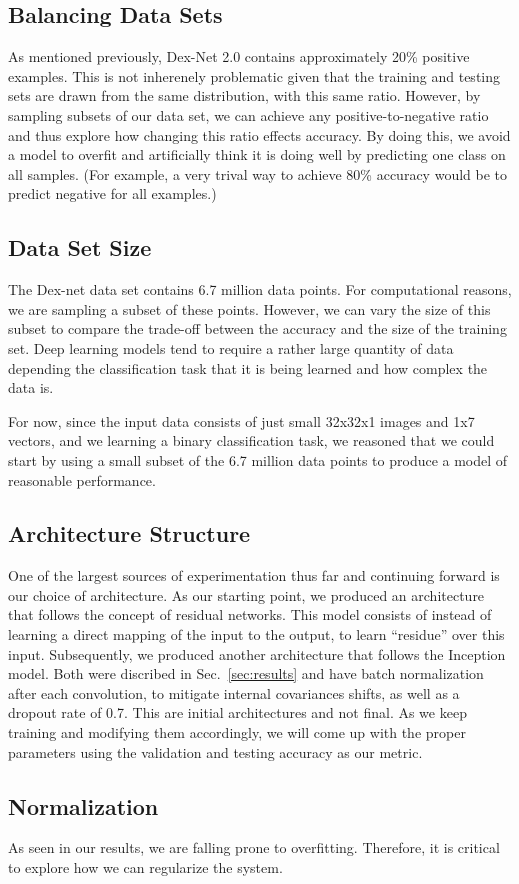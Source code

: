 \documentclass[letterpaper, 10 pt, conference]{../ieeeconf}
\newcommand{\sref}[1]{Sec.~\ref{#1}} %
\begin{document}
\subsection{Balancing Data Sets}
As mentioned previously, Dex-Net 2.0 contains approximately 20\% positive examples. 
This is not inherenely problematic given that the training and testing sets are drawn from the same distribution, with this same ratio.
However, by sampling subsets of our data set, we can achieve any positive-to-negative ratio and thus explore how changing this ratio effects accuracy. 
By doing this, we avoid a model to overfit and artificially think it is doing well by predicting one class on all samples.
(For example, a very trival way to achieve 80\% accuracy would be to predict negative for all examples.)

\subsection{Data Set Size}
The Dex-net data set contains 6.7 million data points. 
For computational reasons, we are sampling a subset of these points. 
However, we can vary the size of this subset to compare the trade-off between the accuracy and the size of the training set. 
Deep learning models tend to require a rather large quantity of data depending the classification task that it is being learned and how complex the data is.

For now, since the input data consists of just small 32x32x1 images and 1x7 vectors, and we learning a binary classification task, we reasoned that we could start by using a small subset of the 6.7 million data points to produce a model of reasonable performance.

\subsection{Architecture Structure}
One of the largest sources of experimentation thus far and continuing forward is our choice of architecture. 
As our starting point, we produced an architecture that follows the concept of residual networks. 
This model consists of instead of learning a direct mapping of the input to the output, to learn ``residue'' over this input. Subsequently, we produced another architecture that follows the Inception model.
Both were discribed in \sref{sec:results} and have batch normalization after each convolution, to mitigate internal covariances shifts, as well as a dropout rate of 0.7. 
This are initial architectures and not final. 
As we keep training and modifying them accordingly, we will come up with the proper parameters using the validation and testing accuracy as our metric.

\subsection{Normalization}
As seen in our results, we are falling prone to overfitting. 
Therefore, it is critical to explore how we can regularize the system. 

{\footnotesize
    
}
\end{document}
